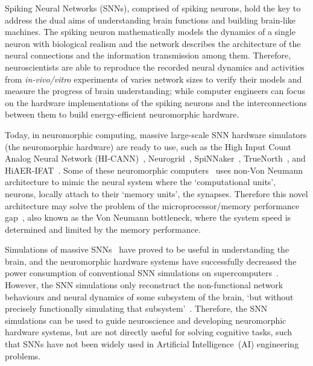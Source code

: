 Spiking Neural Networks (SNNs), comprised of spiking neurons, hold the key to address the dual aims of understanding brain functions and building brain-like machines.
The spiking neuron mathematically models the dynamics of a single neuron with biological realism and the network describes the architecture of the neural connections and the information transmission among them.
Therefore, neuroscientists are able to reproduce the recorded neural dynamics and activities from \textit{in-vivo/vitro} experiments of varies network sizes to verify their models and measure the progress of brain understanding;
while computer engineers can focus on the hardware implementations of the spiking neurons and the interconnections between them to build energy-efficient neuromorphic hardware.

Today, in neuromorphic computing, massive large-scale SNN hardware simulators (the neuromorphic hardware) are ready to use, such as the High Input Count Analog Neural Network (HI-CANN)~\citep{schemmel2010wafer}, Neurogrid~\citep{benjamin2014neurogrid}, SpiNNaker~\citep{furber2014spinnaker}, TrueNorth~\citep{merolla2014million}, and HiAER-IFAT~\citep{yu201265k}.
Some of these neuromorphic computers~\citep{schemmel2010wafer,benjamin2014neurogrid,merolla2014million} uses non-Von Neumann architecture to mimic the neural system where the `computational units', neurons, locally attach to their `memory units', the synapses.
Therefore this novel architecture may solve the problem of the microprocessor/memory performance gap~\citep{wulf1995hitting}, also known as the Von Neumann bottleneck, where the system speed is determined and limited by the memory performance.

Simulations of massive SNNs~\citep{markram2006blue,ananthanarayanan2009cat} have proved to be useful in understanding the brain, and the neuromorphic hardware systems have successfully decreased the power consumption of conventional SNN simulations on supercomputers~\citep{de2010world,sharp2012power}.
However, the SNN simulations only reconstruct the non-functional network behaviours and neural dynamics of some subsystem of the brain, `but without precisely functionally simulating that subsystem'~\citep{de2010world}.
Therefore, the SNN simulations can be used to guide neuroscience and developing neuromorphic hardware systems, but are not directly useful for solving cognitive tasks, such that SNNs have not been widely used in Artificial Intelligence~(AI) engineering problems.

